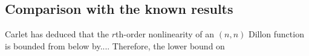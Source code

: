 \documentclass{article}
\newcommand{\0}{\textbf{0}}
\newcommand{\1}{\textbf{1}}
\newcommand{\TRACE}{\operatorname{Tr}_1^k}
\theoremstyle{plain}
\theoremstyle{nonumberplain}
\begin{document}
    \subsection{Comparison with the known results}
        Carlet has deduced that the $ r $th-order nonlinearity of an $ (n,n) $ Dillon function is bounded from 
        below by.... 
        Therefore, the lower bound on
    
    
    
   





\end{document}
